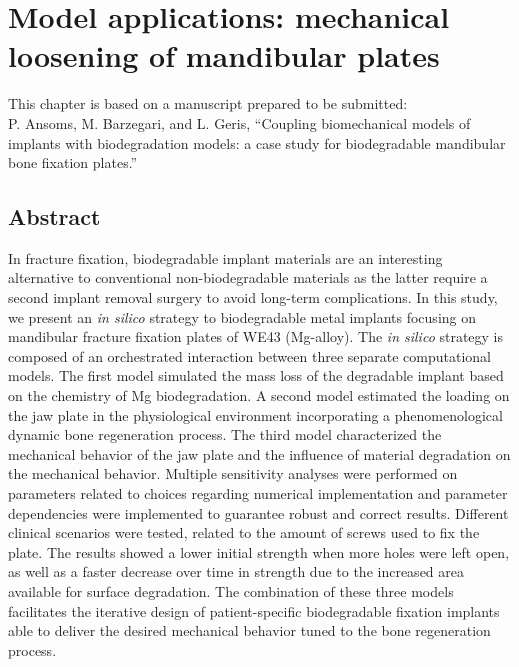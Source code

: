 \chapter{Model applications: mechanical loosening of mandibular plates}\label{ch:mandible}

\begin{shaded}
This chapter is based on a manuscript prepared to be submitted:\\
P. Ansoms, M. Barzegari, and L. Geris, ``Coupling biomechanical models of implants with biodegradation models: a case study for biodegradable mandibular bone fixation plates.''
\end{shaded}

\section*{Abstract}

In fracture fixation, biodegradable implant materials are an interesting alternative to conventional non-biodegradable materials as the latter require a second implant removal surgery to avoid long-term complications. In this study, we present an \textit{in silico} strategy to biodegradable metal implants focusing on mandibular fracture fixation plates of WE43 (Mg-alloy). The \textit{in silico} strategy is composed of an orchestrated interaction between three separate computational models. The first model simulated the mass loss of the degradable implant based on the chemistry of Mg biodegradation. A second model estimated the loading on the jaw plate in the physiological environment incorporating a phenomenological dynamic bone regeneration process. The third model characterized the mechanical behavior of the jaw plate and the influence of material degradation on the mechanical behavior. Multiple sensitivity analyses were performed on parameters related to choices regarding numerical implementation and parameter dependencies were implemented to guarantee robust and correct results. Different clinical scenarios were tested, related to the amount of screws used to fix the plate. The results showed a lower initial strength when more holes were left open, as well as a faster decrease over time in strength due to the increased area available for surface degradation. The combination of these three models facilitates the iterative design of patient-specific biodegradable fixation implants able to deliver the desired mechanical behavior tuned to the bone regeneration process.

